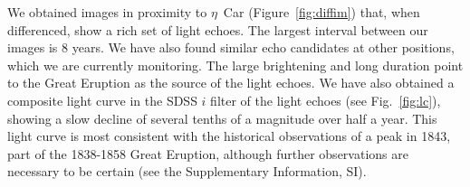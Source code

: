 


We obtained images in proximity to $\eta$~Car
(Figure~\ref{fig:diffim}) that, when differenced, show a rich set of
light echoes. The largest interval between our images is 8 years.  We
have also found similar echo candidates at other positions, which we
are currently monitoring.  The large brightening and long duration
point to the Great Eruption as the source of the light echoes.  We
have also obtained a composite light curve in the SDSS $i$ filter of
the light echoes (see Fig.~\ref{fig:lc}),
showing a slow decline of several tenths of a magnitude over half a
year.  This light curve is most consistent with the historical
observations\cite{SF11} of a peak in 1843, part of the 1838-1858 Great
Eruption, although further observations are necessary to be certain
(see the Supplementary Information, SI).

